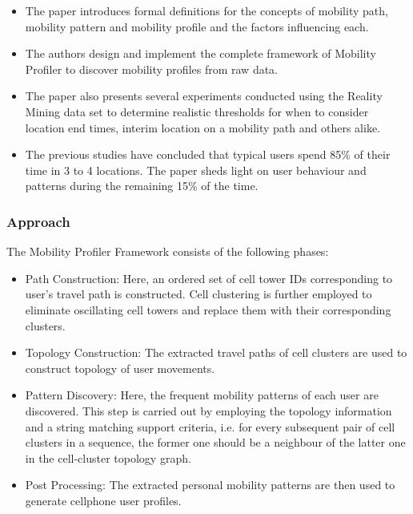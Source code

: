 \begin{itemize}
	
	\item The paper introduces formal definitions for the concepts of mobility path, mobility 
	pattern and mobility profile and the factors influencing each. 
	
	\item The authors design and implement the complete framework of Mobility Profiler to 
	discover mobility profiles from raw data. 
	
	\item The paper also presents several experiments conducted using the Reality Mining data 
	set to determine realistic thresholds for when to consider location end times, interim 
	location on a mobility path and others alike. 
	
	\item The previous studies have concluded that typical users spend 85\% of their time in
	3 to 4 locations. The paper sheds light on user behaviour and patterns during the 
	remaining 15\% of the time. 
	
	 
\end{itemize}

\subsubsection*{Approach}

The Mobility Profiler Framework consists of the following phases: 

\begin{itemize}

	\item Path Construction: Here, an ordered set of cell tower IDs corresponding to 
	user's travel path is constructed. Cell clustering is further employed to eliminate 
	oscillating cell towers and replace them with their corresponding clusters. 
	
	\item Topology Construction: The extracted travel paths of cell clusters are used to 
	construct topology of user movements. 
	
	\item Pattern Discovery: Here, the frequent mobility patterns of each user are discovered. 
	This step is carried out by employing the topology information and a string matching 
	support criteria, i.e. for every subsequent pair of cell clusters in a sequence, the 
	former one should be a neighbour of the latter one in the cell-cluster topology graph. 
	
	\item Post Processing: The extracted personal mobility patterns are then used to generate
	cellphone user profiles. 
	 
\end{itemize}


